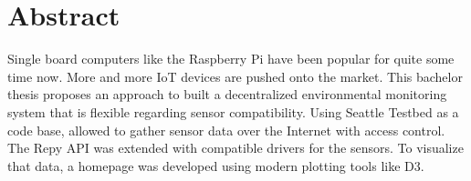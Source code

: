 \documentclass[bachelorthesis, grey, english]{mas-thesis-chapters} %
\begin{document}



%
%
\makelicensepageCCBYSA






\cleardoublepage
\affidavit

\graphicspath{{components/images/}}

\cleardoublepage
{}

\section*{Abstract}
{}%

Single board computers like the Raspberry Pi have been popular for quite some time now. More and more \gls{IoT} devices are pushed onto the market. This bachelor thesis proposes an approach to built a decentralized environmental monitoring system that is flexible regarding sensor compatibility. Using Seattle Testbed as a code base, allowed to gather sensor data over the Internet with access control. The \gls{Repy} \gls{API} was extended with compatible drivers for the sensors. To visualize that data, a homepage was developed using modern plotting tools like D3. 

\newpage

%
\tableofcontents		%
\newpage
\listofillustrations	%
\end{document}
